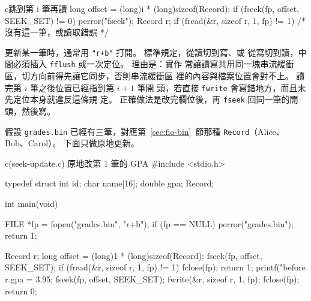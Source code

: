 \begin{center}
\label{fig:fio-seek}
\end{center}

\begin{code}{c}{跳到第 i 筆再讀}
long offset = (long)i * (long)sizeof(Record);
if (fseek(fp, offset, SEEK_SET) != 0) {
    perror("fseek");
}
Record r;
if (fread(&r, sizeof r, 1, fp) != 1) {
    /* 沒有這一筆，或讀取錯誤 */
}
\end{code}

更新某一筆時，通常用 \texttt{"r+b"} 打開。 標準規定，從讀切到寫、或
從寫切到讀，中間必須插入 \texttt{fflush} 或一次定位。 理由是：實作
常讓讀寫共用同一塊串流緩衝區，切方向前得先讓它同步，否則串流緩衝區
裡的內容與檔案位置會對不上。 讀完第 $i$ 筆之後位置已經指到第 $i+1$ 筆開
頭，若直接 \texttt{fwrite} 會寫錯地方，而且未先定位本身就違反這條規
定。 正確做法是改完欄位後，再 \texttt{fseek} 回同一筆的開頭，然後寫。

假設 \texttt{grades.bin} 已經有三筆，對應第~\ref{sec:fio-bin}~節那種
\texttt{Record}（Alice、Bob、Carol）。 下面只做原地更新。

\begin{example}[label=ex:fio-update]{c}{(seek-update.c) 原地改第 1 筆的 GPA}
#include <stdio.h>

typedef struct {
    int id;
    char name[16];
    double gpa;
} Record;

int main(void) {
    FILE *fp = fopen("grades.bin", "r+b");
    if (fp == NULL) {
        perror("grades.bin");
        return 1;
    }

    Record r;
    long offset = (long)1 * (long)sizeof(Record);
    fseek(fp, offset, SEEK_SET);
    if (fread(&r, sizeof r, 1, fp) != 1) {
        fclose(fp);
        return 1;
    }
    printf("before %
    r.gpa = 3.95;
    fseek(fp, offset, SEEK_SET);
    fwrite(&r, sizeof r, 1, fp);
    fclose(fp);
    return 0;
}
\end{example}

